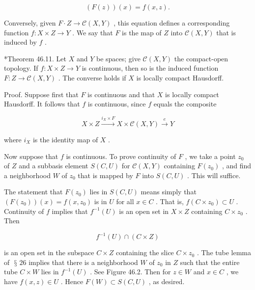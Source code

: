 \documentclass[10pt]{article}
\begin{document}
\[
\left( {F\left( z\right) }\right) \left( x\right)  = f\left( {x,z}\right) .
\]

Conversely, given \(F \cdot  Z \rightarrow  \mathcal{C}\left( {X,Y}\right)\) , this equation defines a corresponding function \(f : X \times  Z \rightarrow  Y\) . We say that \(F\) is the map of \(Z\) into \(\mathcal{C}\left( {X,Y}\right)\) that is induced by \(f\) .

*Theorem 46.11. Let \(X\) and \(Y\) be spaces; give \(\mathcal{C}\left( {X,Y}\right)\) the compact-open topology. If \(f : X \times  Z \rightarrow  Y\) is continuous, then so is the induced function \(F : Z \rightarrow  \mathcal{C}\left( {X,Y}\right)\) . The converse holds if \(X\) is locally compact Hausdorff.

Proof. Suppose first that \(F\) is continuous and that \(X\) is locally compact Hausdorff. It follows that \(f\) is continuous, since \(f\) equals the composite

\[
X \times  Z\overset{{i}_{X} \times  F}{ \rightarrow  }X \times  \mathcal{C}\left( {X,Y}\right) \overset{e}{ \rightarrow  }Y
\]

where \({i}_{X}\) is the identity map of \(X\) .

Now suppose that \(f\) is continuous. To prove continuity of \(F\) , we take a point \({z}_{0}\) of \(Z\) and a subbasis element \(S\left( {C,U}\right)\) for \(\mathcal{C}\left( {X,Y}\right)\) containing \(F\left( {z}_{0}\right)\) , and find a neighborhood \(W\) of \({z}_{0}\) that is mapped by \(F\) into \(S\left( {C,U}\right)\) . This will suffice.

The statement that \(F\left( {z}_{0}\right)\) lies in \(S\left( {C,U}\right)\) means simply that \(\left( {F\left( {z}_{0}\right) }\right) \left( x\right)  = f\left( {x,{z}_{0}}\right)\) is in \(U\) for all \(x \in  C\) . That is, \(f\left( {C \times  {z}_{0}}\right)  \subset  U\) . Continuity of \(f\) implies that \({f}^{-1}\left( U\right)\) is an open set in \(X \times  Z\) containing \(C \times  {z}_{0}\) . Then

\[
{f}^{-1}\left( U\right)  \cap  \left( {C \times  Z}\right)
\]

is an open set in the subspace \(C \times  Z\) containing the slice \(C \times  {z}_{0}\) . The tube lemma of \(\text{ § }{26}\) implies that there is a neighborhood \(W\) of \({z}_{0}\) in \(Z\) such that the entire tube \(C \times  W\) lies in \({f}^{-1}\left( U\right)\) . See Figure 46.2. Then for \(z \in  W\) and \(x \in  C\) , we have \(f\left( {x,z}\right)  \in  U\) . Hence \(F\left( W\right)  \subset  S\left( {C,U}\right)\) , as desired.
\end{document}
